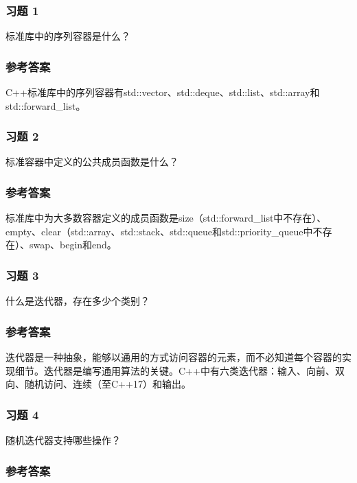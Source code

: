 \subsubsection{习题 1}

标准库中的序列容器是什么？

\subsubsection{参考答案}

C++标准库中的序列容器有std::vector、std::deque、std::list、std::array和std::forward_list。


\subsubsection{习题 2}

标准容器中定义的公共成员函数是什么？

\subsubsection{参考答案}

标准库中为大多数容器定义的成员函数是size（std::forward_list中不存在）、empty、clear（std::array、std::stack、std::queue和std::priority_queue中不存在）、swap、begin和end。

\subsubsection{习题 3}

什么是迭代器，存在多少个类别？

\subsubsection{参考答案}

迭代器是一种抽象，能够以通用的方式访问容器的元素，而不必知道每个容器的实现细节。迭代器是编写通用算法的关键。C++中有六类迭代器：输入、向前、双向、随机访问、连续（至C++17）和输出。

\subsubsection{习题 4}

随机迭代器支持哪些操作？

\subsubsection{参考答案}

